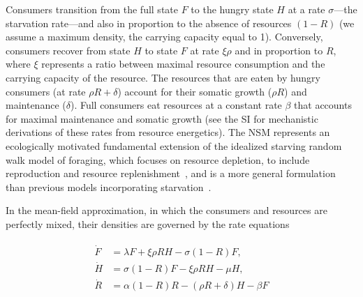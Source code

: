 \documentclass[twocolumn,preprintnumbers,amsmath,amssymb,superscriptaddress]{revtex4}
\begin{document}
Consumers transition from the full state $F$ to the hungry state $H$ at a
rate $\sigma$---the starvation rate---and also in proportion to the absence
of resources $(1-R)$ (we assume a maximum density, the carrying capacity equal to 1).  Conversely, consumers recover from state $H$ to state
$F$ at rate $\xi \rho$ and in proportion to $R$, where $\xi$ represents a
ratio between maximal resource consumption and the carrying capacity of the
resource. %
The resources that are eaten by hungry consumers (at rate $\rho R + \delta$)
account for their somatic growth ($\rho R$) and maintenance ($\delta$).  Full
consumers eat resources at a constant rate $\beta$ that accounts for maximal
maintenance and somatic growth (see the SI for mechanistic
derivations of these rates from resource energetics).
The NSM represents an ecologically motivated fundamental extension of the idealized starving random walk model of foraging, which focuses on resource depletion, to include reproduction and resource replenishment~\citep{Benichou:2014wu,Benichou:2016wl,Chupeau:2016jf}, and is a more general formulation than previous models incorporating starvation~\citep{Persson:1998hz}.

In the mean-field approximation, in which the consumers and resources are
perfectly mixed, their densities are governed by the rate equations

\begin{align}
\label{eq:system}
\begin{split}
\dot{F} &= \lambda F + \xi \rho RH - \sigma \left(1-R\right)F,  \\
\dot{H} &= \sigma \left(1-R\right)F - \xi \rho RH - \mu H,  \\
\dot{R} &= \alpha \left(1-R\right)R -\left(\rho R+\delta\right)H-\beta F
\end{split}
\end{align}
\end{document}
